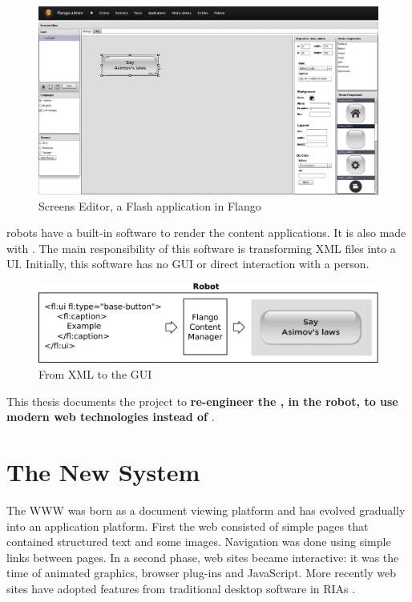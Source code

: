\begin{figure}[htb]
    \label{fig:screens-editor}
    \centering
    \includegraphics[width=\textwidth]{figures/screens-editor}
    \caption{Screens Editor, a Flash application in Flango}
\end{figure}

\reem{} robots have a built-in software to render the content applications. 
It is also made with \flash .
The main responsibility of this software is transforming \ac{XML} files into a \ac{UI}. 
Initially, this software has no \ac{GUI} or direct interaction with a person.

\begin{figure}[htb]
    \label{fig:xml-flango-view}
    \centering
    \includegraphics[width=\textwidth]{figures/xml-flango-screenshot}
    \caption{From \ac{XML} to the \ac{GUI}}
\end{figure}

This thesis documents the project to \textbf{re-engineer the \cm , in the robot, to use modern web technologies instead of \flash}.

\section{The New System}
The \ac{WWW} was born as a document viewing platform and has evolved gradually into an application platform. 
First the web consisted of simple pages that contained structured text and some images. 
Navigation was done using simple links between pages. 
In a second phase, web sites became interactive: 
it was the time of animated graphics, browser plug-ins and JavaScript. 
More recently web sites have adopted features from traditional desktop software in \acp{RIA} \cite{Anttonen:2011}.

